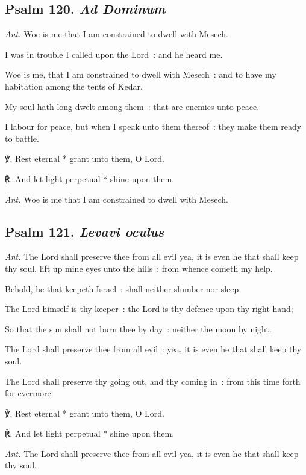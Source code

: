 \subsection{Psalm 120. \textit{Ad Dominum}}\par\noindent
\textit{Ant.} Woe is me {\dag} that I am constrained to dwell with Mesech.\par
{} I was in trouble I called upon the Lord~: and he heard me.\par
{}
Woe is me, that I am constrained to dwell with Mesech~: and to have my habitation among the tents of Kedar.\par
{}My soul hath long dwelt among them~: that are enemies unto peace.\par
{}I labour for peace, but when I speak unto them thereof~: they make them ready to battle.\par
℣. Rest eternal * grant unto them, O Lord.\par
℟. And let light perpetual * shine upon them.\par\noindent
\textit{Ant.} Woe is me that I am constrained to dwell with Mesech.
\subsection{Psalm 121. \textit{Levavi oculus}}\noindent
\textit{Ant.} The Lord {\dag} shall preserve thee from all evil yea, it is even he that shall keep thy soul.
 lift up mine eyes unto the hills~: from whence cometh my help.\par
{}
Behold, he that keepeth Israel~: shall neither slumber nor sleep.\par
{}The Lord himself is thy keeper~: the Lord is thy defence upon thy right hand;\par
{}So that the sun shall not burn thee by day~: neither the moon by night.\par
{}The Lord shall preserve thee from all evil~: yea, it is even he that shall keep thy soul.\par
{}The Lord shall preserve thy going out, and thy coming in~: from this time forth for evermore.
\par
℣. Rest eternal * grant unto them, O Lord.\par
℟. And let light perpetual * shine upon them.\par\noindent
\textit{Ant.} The Lord shall preserve thee from all evil yea, it is even he that shall keep thy soul.

